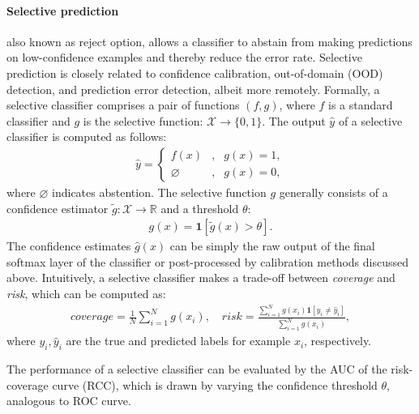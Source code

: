 \paragraph{Selective prediction} also known as reject option, allows a classifier to abstain from making predictions on low-confidence examples and thereby reduce the error rate. Selective prediction is closely related to confidence calibration, out-of-domain (OOD) detection, and prediction error detection, albeit more remotely.
Formally, a selective classifier comprises a pair of functions $(f, g)$, where $f$ is a standard classifier and $g$ is the selective function: $\mathcal{X} \rightarrow \{0, 1\}$. The output $\hat{y}$ of a selective classifier is computed as follows:
\begin{gather}
\hat{y}=\left\{
\begin{aligned}
f(x) & , & g(x)=1, \\
\varnothing & , & g(x)=0,
\end{aligned}
\right.
\end{gather}
where $\varnothing$ indicates abstention. The selective function $g$ generally consists of a confidence estimator $\tilde{g}: \mathcal{X} \rightarrow \mathbb{R}$ and a threshold $\theta$:
\begin{gather}
    g(x) = \mathbf{1}[\tilde{g}(x) > \theta].
\end{gather}
The confidence estimates $\hat{g}(x)$ can be simply the raw output of the final softmax layer of the classifier or post-processed by calibration methods discussed above.
Intuitively, a selective classifier makes a trade-off between \emph{coverage} and \emph{risk}, which can be computed as:
\begin{gather}
    coverage = \frac{1}{N} \sum_{i=1}^{N} g(x_{i}), \quad risk = \frac{\sum_{i=1}^{N} g(x_{i}) \mathbf{1}[y_{i} \neq \hat{y}_{i}]}{\sum_{i=1}^{N} g(x_{i})},
\end{gather}
where $y_{i}, \hat{y}_{i}$ are the true and predicted labels for example $x_{i}$, respectively.

The performance of a selective classifier can be evaluated by the AUC of the risk-coverage curve (RCC), which is drawn by varying the confidence threshold $\theta$, analogous to ROC curve. 

